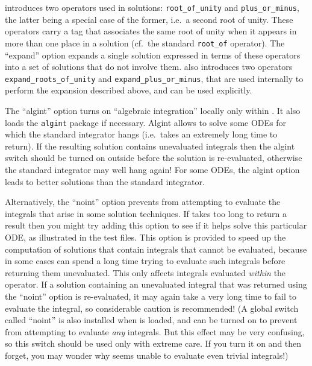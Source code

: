 \hypertarget{operator:ROOT_OF_UNITY}{}
\hypertarget{operator:PLUS_OR_MINUS}{}
 introduces two operators used in solutions:
\texttt{root\_of\_unity} and \texttt{plus\_or\_minus}, the latter
being a special case of the former, i.e.\ a second root of unity.
These operators carry a tag that associates the same root of unity
when it appears in more than one place in a solution (cf.\ the
standard \texttt{root\_of} operator).  The ``expand'' option expands a
single solution expressed in terms of these operators into a set of
solutions that do not involve them.   also introduces two
operators \texttt{expand\_roots\_of\_unity} and
\texttt{expand\_plus\_or\_minus}, that are used internally to perform
the expansion described above, and can be used explicitly.

The ``algint'' option turns on ``algebraic integration'' locally only
within .  It also loads the \texttt{algint} package if
necessary.  Algint allows  to solve some ODEs for which the
standard \REDUCE{} integrator hangs (i.e.\ takes an extremely long
time to return).  If the resulting solution contains unevaluated
integrals then the algint switch should be turned on outside 
before the solution is re-evaluated, otherwise the standard integrator
may well hang again!  For some ODEs, the algint option leads to better
solutions than the standard \REDUCE{} integrator.

Alternatively, the ``noint'' option prevents \REDUCE{} from attempting
to evaluate the integrals that arise in some solution techniques.  If
 takes too long to return a result then you might try adding
this option to see if it helps solve this particular ODE, as
illustrated in the test files.  This option is provided to speed up
the computation of solutions that contain integrals that cannot be
evaluated, because in some cases \REDUCE{} can spend a long time
trying to evaluate such integrals before returning them unevaluated.
This only affects integrals evaluated \emph{within} the \odesolve{}
operator.  If a solution containing an unevaluated integral that was
returned using the ``noint'' option is re-evaluated, it may again take
\REDUCE{} a very long time to fail to evaluate the integral, so
considerable caution is recommended!  (A global switch called
``noint'' is also installed when  is loaded, and can be
turned on to prevent \REDUCE{} from attempting to evaluate \emph{any}
integrals.  But this effect may be very confusing, so this switch
should be used only with extreme care.  If you turn it on and then
forget, you may wonder why \REDUCE{} seems unable to evaluate even
trivial integrals!)

